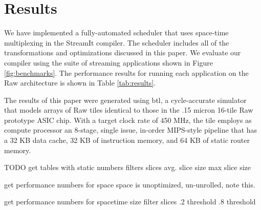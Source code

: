 \section{Results}
\label{sec:results}

We have implemented a fully-automated scheduler that uses space-time
multiplexing in the StreamIt compiler.  The scheduler includes all of
the transformations and optimizations discussed in this paper.  We
evaluate our compiler using the suite of streaming applications shown
in Figure \ref{fig:benchmarks}.  The performance results for running
each application on the Raw architecture is shown in Table
\ref{tab:results}.

The results of this paper were generated using btl, a cycle-accurate
simulator that models arrays of Raw tiles identical to those in the
.15 micron 16-tile Raw prototype ASIC chip.  With a target clock rate
of 450 MHz, the tile employs as compute processor an 8-stage, single
issue, in-order MIPS-style pipeline that has a 32 KB data cache, 32 KB
of instruction memory, and 64 KB of static router memory.


TODO
get tables with static numbers
	filters
	slices
	avg. slice size
	max slice size

get performance numbers for space
	space is unoptimized, un-unrolled, note this.

get performance numbers for spacetime 
	size filter slices
	.2 threshold
	.8 threshold
